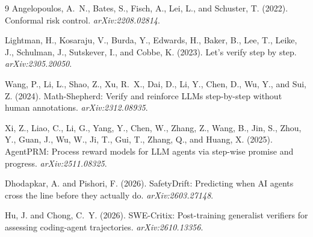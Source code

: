 \documentclass[11pt]{article}
\begin{document}
\begin{thebibliography}{9}
\small
{}
Angelopoulos, A.~N., Bates, S., Fisch, A., Lei, L., and
Schuster, T. (2022). Conformal risk control.
\emph{arXiv:2208.02814}.

Lightman, H., Kosaraju, V., Burda, Y., Edwards, H., Baker, B.,
Lee, T., Leike, J., Schulman, J., Sutskever, I., and Cobbe, K.
(2023). Let's verify step by step. \emph{arXiv:2305.20050}.

Wang, P., Li, L., Shao, Z., Xu, R.~X., Dai, D., Li, Y., Chen,
D., Wu, Y., and Sui, Z. (2024). Math-Shepherd: Verify and
reinforce LLMs step-by-step without human annotations.
\emph{arXiv:2312.08935}.

Xi, Z., Liao, C., Li, G., Yang, Y., Chen, W., Zhang, Z., Wang,
B., Jin, S., Zhou, Y., Guan, J., Wu, W., Ji, T., Gui, T.,
Zhang, Q., and Huang, X. (2025). AgentPRM: Process reward
models for LLM agents via step-wise promise and progress.
\emph{arXiv:2511.08325}.

Dhodapkar, A. and Pishori, F. (2026). SafetyDrift: Predicting
when AI agents cross the line before they actually do.
\emph{arXiv:2603.27148}.

Hu, J. and Chong, C.~Y. (2026). SWE-Critix: Post-training
generalist verifiers for assessing coding-agent trajectories.
\emph{arXiv:2610.13356}.
\end{thebibliography}
\end{document}
